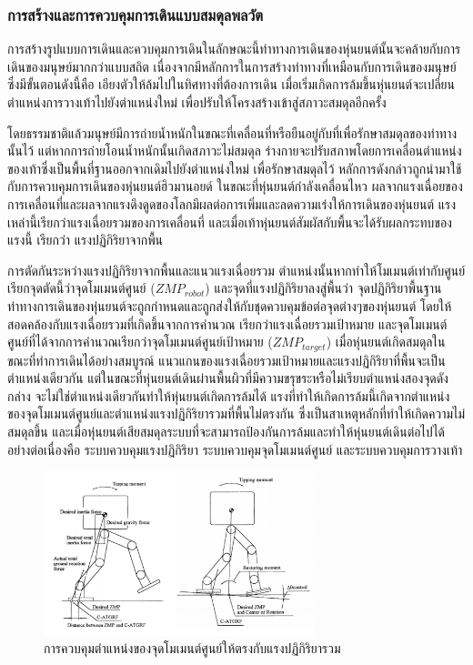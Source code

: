 \subsubsection{การสร้างและการควบคุมการเดินแบบสมดุลพลวัต}
การสร้างรูปแบบการเดินและควบคุมการเดินในลักษณะนี้ท่าทางการเดินของหุ่นยนต์นั้นจะคล้ายกับการเดินของมนุษย์มากกว่าแบบสถิต
เนื่องจากมีหลักการในการสร้างท่าทางที่เหมือนกับการเดินของมนุษย์ซึ่งมีขั้นตอนดังนี้คือ เอียงตัวให้ล้มไปในทิศทางที่ต้องการเดิน
เมื่อเริ่มเกิดการล้มขึ้นหุ่นยนต์จะเปลี่ยนตำแหน่งการวางเท้าไปยังตำแหน่งใหม่ เพื่อปรับให้โครงสร้างเข้าสู่สภาวะสมดุลอีกครั้ง

โดยธรรมชาติแล้วมนุษย์มีการถ่ายน้ำหนักในขณะที่เคลื่อนที่หรือยืนอยู่กับที่เพื่อรักษาสมดุลของท่าทางนั้นไว้
แต่หากการถ่ายโอนน้ำหนักนั้นเกิดสภาวะไม่สมดุล ร่างกายจะปรับสภาพโดยการเคลื่อนตำแหน่งของเท้าซึ่งเป็นพื้นที่ฐานออกจากเดิมไปยังตำแหน่งใหม่
เพื่อรักษาสมดุลไว้ หลักการดังกล่าวถูกนำมาใช้กับการควบคุมการเดินของหุ่นยนต์ฮิวมานอยด์ ในขณะที่หุ่นยนต์กำลังเคลื่อนไหว
ผลจากแรงเฉื่อยของการเคลื่อนที่และผลจากแรงดึงดูดของโลกมีผลต่อการเพิ่มและลดความเร่งให้การเดินของหุ่นยนต์
แรงเหล่านี้เรียกว่าแรงเฉื่อยรวมของการเคลื่อนที่ และเมื่อเท้าหุ่นยนต์สัมผัสกับพื้นจะได้รับผลกระทบของแรงนี้ เรียกว่า
แรงปฏิกิริยาจากพื้น

การตัดกันระหว่างแรงปฏิกิริยาจากพื้นและแนวแรงเฉื่อยรวม ตำแหน่งนั้นหากทำให้โมเมนต์เท่ากับศูนย์
เรียกจุดตัดนี้ว่าจุดโมเมนต์ศูนย์ ($ZMP_{robot}$) และจุดที่แรงปฏิกิริยาลงสู่พื้นว่า จุดปฏิกิริยาพื้นฐาน 
ท่าทางการเดินของหุ่นยนต์จะถูกกำหนดและถูกส่งให้กับชุดควบคุมข้อต่อจุดต่างๆของหุ่นยนต์ โดยให้สอดคล้องกับแรงเฉื่อยรวมที่เกิดขึ้นจากการคำนวณ
เรียกว่าแรงเฉื่อยรวมเป้าหมาย และจุดโมเมนต์ศูนย์ที่ได้จากการคำนวณเรียกว่าจุดโมเมนต์ศูนย์เป้าหมาย ($ZMP_{target}$)
เมื่อหุ่นยนต์เกิดสมดุลในขณะที่ทำการเดินได้อย่างสมบูรณ์ แนวแกนของแรงเฉื่อยรวมเป้าหมายและแรงปฏิกิริยาที่พื้นจะเป็นตำแหน่งเดียวกัน
แต่ในขณะที่หุ่นยนต์เดินผ่านพื้นผิวที่มีความขรุขระหรือไม่เรียบตำแหน่งสองจุดดังกล่าง จะไม่ใช่ตำแหน่งเดียวกันทำให้หุ่นยนต์เกิดการล้มได้
แรงที่ทำให้เกิดการล้มนี้เกิดจากตำแหน่งของจุดโมเมนต์ศูนย์และตำแหน่งแรงปฏิกิริยารวมที่พื้นไม่ตรงกัน ซึ่งเป็นสาเหตุหลักที่ทำให้เกิดความไม่สมดุลขึ้น
และเมื่อหุ่นยนต์เสียสมดุลระบบที่จะสามารถป้องกันการล้มและทำให้หุ่นยนต์เดินต่อไปได้อย่างต่อเนื่องคือ ระบบควบคุมแรงปฏิกิริยา
ระบบควบคุมจุดโมเมนต์ศูนย์ และระบบควบคุมการวางเท้า

\begin{figure}[ht]
	\centering
	\includegraphics[width=0.7\textwidth]{chapter2/images/zmpdynamicwalking.png}
	\caption{การควบคุมตำแหน่งของจุดโมเมนต์ศูนย์ให้ตรงกับแรงปฏิกิริยารวม}
	\label{fig:robot_zmp_support}
\end{figure}

